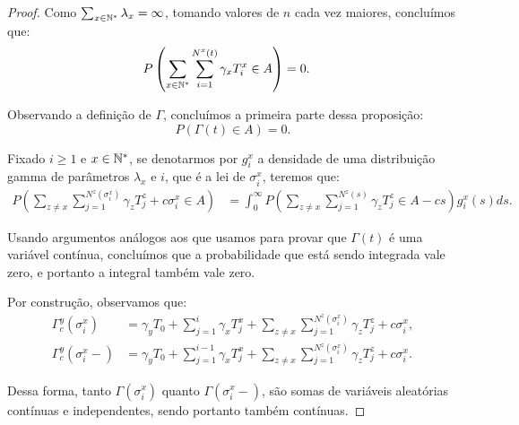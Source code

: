 \begin{proof}
  Como $\sum_{x \in {\mathbb{N^*}}} \lambda_x = \infty$, tomando valores de $n$
  cada vez maiores, concluímos que:
  \begin{align*}
    P\left(\sum_{x \in {\mathbb{N^*}}}\sum_{i = 1}^{N^x(t)} \gamma_x T_i^x \in A \right) 
    &= 0.
  \end{align*}

  Observando a definição de $\Gamma$, concluímos a primeira
  parte dessa proposição:
  \begin{displaymath}
    P\left( \Gamma(t) \in A \right) = 0.
  \end{displaymath}


  Fixado $i \geq 1$ e $x \in {\mathbb{N^*}}$, se denotarmos por $g^x_i$ a
  densidade de uma distribuição gamma de parâmetros $\lambda_x$ e $i$,
  que é a lei de $\sigma^x_i$, teremos que:
  \begin{align*}
    P \left(
      \sum_{z \neq x} \sum_{j = 1}^{N^z(\sigma^x_i)} \gamma_z T^z_j
      + c \sigma^x_i
      \in A
    \right)
    &= \int_0^\infty
     P \left(
      \sum_{z \neq x} \sum_{j = 1}^{N^z(s)} \gamma_z T^z_j
      \in A - c s
    \right)
    g_i^x (s) d s.
  \end{align*}

  Usando argumentos análogos aos que usamos para provar que
  $\Gamma(t)$ é uma variável contínua, concluímos que a probabilidade
  que está sendo integrada vale zero, e portanto a integral também
  vale zero.

  Por construção, observamos que:
  \begin{align*}
    \Gamma^y_c(\sigma^x_i)  &=
     \gamma_y T_0 + \sum_{j = 1}^{i} \gamma_x
    T_j^x + \sum_{z \neq x} \sum_{j = 1}^{N^z(\sigma^x_i)} \gamma_z
    T^z_j + c \sigma^x_i,\\
    \Gamma^y_c(\sigma^x_i -)  &=
     \gamma_y T_0 + \sum_{j = 1}^{i-1} \gamma_x
    T_j^x + \sum_{z \neq x} \sum_{j = 1}^{N^z(\sigma_i^x)} \gamma_z
    T^z_j + c \sigma_i^x.
  \end{align*}

  Dessa forma, tanto $\Gamma(\sigma^x_i)$ quanto
  $\Gamma(\sigma^x_i-)$, são somas de variáveis aleatórias contínuas e
  independentes, sendo portanto também contínuas.
\end{proof}


